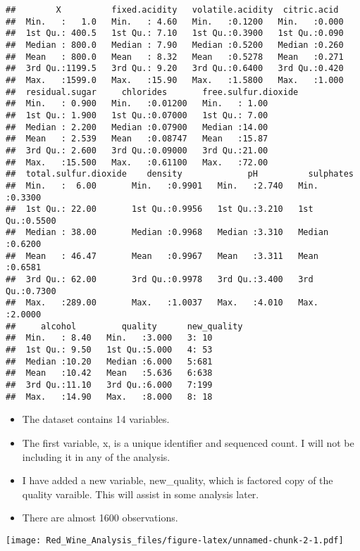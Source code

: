 \documentclass[]{article}
\providecommand{\tightlist}{%
  \setlength{\itemsep}{0pt}\setlength{\parskip}{0pt}}
\begin{document}
\begin{verbatim}
##        X          fixed.acidity   volatile.acidity  citric.acid   
##  Min.   :   1.0   Min.   : 4.60   Min.   :0.1200   Min.   :0.000  
##  1st Qu.: 400.5   1st Qu.: 7.10   1st Qu.:0.3900   1st Qu.:0.090  
##  Median : 800.0   Median : 7.90   Median :0.5200   Median :0.260  
##  Mean   : 800.0   Mean   : 8.32   Mean   :0.5278   Mean   :0.271  
##  3rd Qu.:1199.5   3rd Qu.: 9.20   3rd Qu.:0.6400   3rd Qu.:0.420  
##  Max.   :1599.0   Max.   :15.90   Max.   :1.5800   Max.   :1.000  
##  residual.sugar     chlorides       free.sulfur.dioxide
##  Min.   : 0.900   Min.   :0.01200   Min.   : 1.00      
##  1st Qu.: 1.900   1st Qu.:0.07000   1st Qu.: 7.00      
##  Median : 2.200   Median :0.07900   Median :14.00      
##  Mean   : 2.539   Mean   :0.08747   Mean   :15.87      
##  3rd Qu.: 2.600   3rd Qu.:0.09000   3rd Qu.:21.00      
##  Max.   :15.500   Max.   :0.61100   Max.   :72.00      
##  total.sulfur.dioxide    density             pH          sulphates     
##  Min.   :  6.00       Min.   :0.9901   Min.   :2.740   Min.   :0.3300  
##  1st Qu.: 22.00       1st Qu.:0.9956   1st Qu.:3.210   1st Qu.:0.5500  
##  Median : 38.00       Median :0.9968   Median :3.310   Median :0.6200  
##  Mean   : 46.47       Mean   :0.9967   Mean   :3.311   Mean   :0.6581  
##  3rd Qu.: 62.00       3rd Qu.:0.9978   3rd Qu.:3.400   3rd Qu.:0.7300  
##  Max.   :289.00       Max.   :1.0037   Max.   :4.010   Max.   :2.0000  
##     alcohol         quality      new_quality
##  Min.   : 8.40   Min.   :3.000   3: 10      
##  1st Qu.: 9.50   1st Qu.:5.000   4: 53      
##  Median :10.20   Median :6.000   5:681      
##  Mean   :10.42   Mean   :5.636   6:638      
##  3rd Qu.:11.10   3rd Qu.:6.000   7:199      
##  Max.   :14.90   Max.   :8.000   8: 18
\end{verbatim}

\begin{itemize}
\tightlist
\item
  The dataset contains 14 variables.
\item
  The first variable, x, is a unique identifier and sequenced count. I
  will not be including it in any of the analysis.
\item
  I have added a new variable, new\_quality, which is factored copy of
  the quality varaible. This will assist in some analysis later.
\item
  There are almost 1600 observations.
\end{itemize}

\texttt{[image: Red\_Wine\_Analysis\_files/figure-latex/unnamed-chunk-2-1.pdf]}
\end{document}
